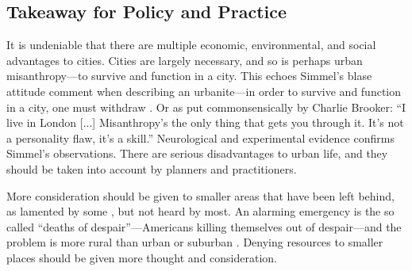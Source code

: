 \documentclass[11pt, letterpaper]{article}
\begin{document}
\begin{spacing}{1.4}
\section*{Takeaway for Policy and Practice}

It is undeniable that there are multiple economic, environmental, and social
advantages to cities. 
 Cities are largely necessary, and so is perhaps urban misanthropy---to survive and function in a city. This echoes Simmel's blase attitude comment when describing an urbanite---in order to survive and function in a city, one must withdraw \citep{simmel03}. Or as put commonsensically by Charlie Brooker:
 ``I live in London [...] Misanthropy's the only thing that gets you
  through it. It's not a personality flaw, it's a skill.''
 Neurological \citep{lederbogen11} and experimental \citep{milgram70} evidence  confirms Simmel's observations. 
 There are serious disadvantages to urban life, and they should be taken into account by planners and practitioners. 
 
 More consideration should be given to smaller areas that have been left behind, as lamented by some
\citep[e.g.,][]{fullerNYT17monD,hansonCityJournalautumn15}, but not heard by
most.
 An alarming emergency is the so called ``deaths of despair''---Americans killing themselves out of despair---and the problem is more rural than urban or suburban \citep{case15,case20}.
Denying resources to smaller places should be given more thought and consideration.
 

\end{spacing}
\end{document}
